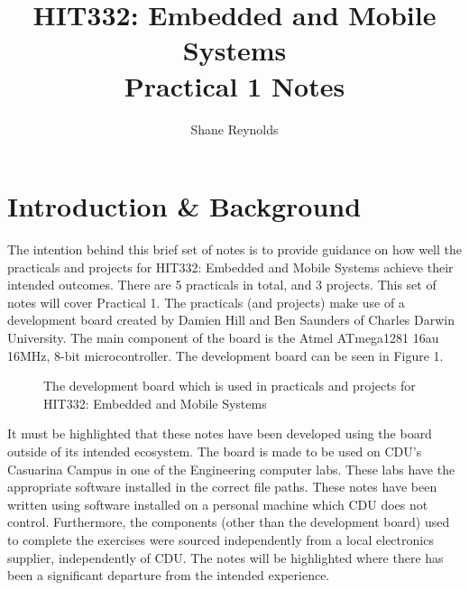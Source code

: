\documentclass[a4paper]{article}
\begin{document}
\title{HIT332: Embedded and Mobile Systems\\ Practical 1 Notes}
\author{Shane Reynolds}
\maketitle

\tableofcontents

\section{Introduction \& Background}
The intention behind this brief set of notes is to provide guidance on how well the practicals and projects for HIT332: Embedded and Mobile Systems achieve their intended outcomes. There are 5 practicals in total, and 3 projects. This set of notes will cover Practical 1. The practicals (and projects) make use of a development board created by Damien Hill and Ben Saunders of Charles Darwin University. The main component of the board is the Atmel ATmega1281 16au 16MHz, 8-bit microcontroller. The development board can be seen in Figure 1.

\begin{figure}[h]
	\centering
	\caption{The development board which is used in practicals and projects for HIT332: Embedded and Mobile Systems}
\end{figure}

It must be highlighted that these notes have been developed using the board outside of its intended ecosystem. The board is made to be used on CDU's Casuarina Campus in one of the Engineering computer labs. These labs have the appropriate software installed in the correct file paths. These notes have been written using software installed on a personal machine which CDU does not control. Furthermore, the components (other than the development board) used to complete the exercises were sourced independently from a local electronics supplier, independently of CDU. The notes will be highlighted where there has been a significant departure from the intended experience.
\end{document}
